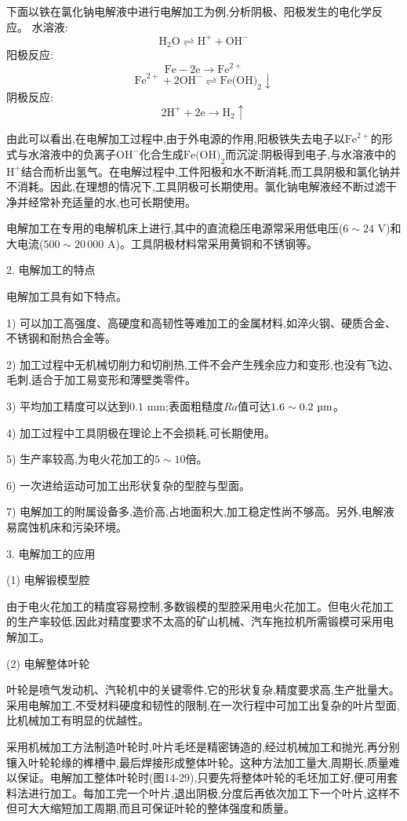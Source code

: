 \documentclass[UTF8]{ctexbook}
\newcommand{\◎}{\ensuremath{\bigcirc}}
\begin{document}
下面以铁在氯化钠电解液中进行电解加工为例,分析阴极、阳极发生的电化学反应。
水溶液:
\[ \text{H}_2\text{O} \rightleftharpoons \text{H}^+ + \text{OH}^- \]
阳极反应:
\[ \text{Fe} - 2\text{e} \longrightarrow \text{Fe}^{2+} \]
\[ \text{Fe}^{2+} + 2\text{OH}^- \rightleftharpoons \text{Fe(OH)}_2 \downarrow \]
阴极反应:
\[ 2\text{H}^+ + 2\text{e} \longrightarrow \text{H}_2 \uparrow \]

由此可以看出,在电解加工过程中,由于外电源的作用,阳极铁失去电子以$\text{Fe}^{2+}$的形式与水溶液中的负离子$\text{OH}^-$化合生成$\text{Fe(OH)}_2$而沉淀;阴极得到电子,与水溶液中的$\text{H}^+$结合而析出氢气。在电解过程中,工件阳极和水不断消耗,而工具阴极和氯化钠并不消耗。因此,在理想的情况下,工具阴极可长期使用。氯化钠电解液经不断过滤干净并经常补充适量的水,也可长期使用。

电解加工在专用的电解机床上进行,其中的直流稳压电源常采用低电压($6 \sim 24 \text{ V}$)和大电流($500 \sim 20\,000 \text{ A}$)。工具阴极材料常采用黄铜和不锈钢等。

2. 电解加工的特点

电解加工具有如下特点。

1) 可以加工高强度、高硬度和高韧性等难加工的金属材料,如淬火钢、硬质合金、不锈钢和耐热合金等。

2) 加工过程中无机械切削力和切削热,工件不会产生残余应力和变形,也没有飞边、毛刺,适合于加工易变形和薄壁类零件。

3) 平均加工精度可以达到$0.1 \text{ mm}$;表面粗糙度$Ra$值可达$1.6 \sim 0.2 \text{ \textmu m}$。

4) 加工过程中工具阴极在理论上不会损耗,可长期使用。

5) 生产率较高,为电火花加工的$5 \sim 10$倍。

6) 一次进给运动可加工出形状复杂的型腔与型面。

7) 电解加工的附属设备多,造价高,占地面积大,加工稳定性尚不够高。另外,电解液易腐蚀机床和污染环境。

3. 电解加工的应用

(1) 电解锻模型腔

由于电火花加工的精度容易控制,多数锻模的型腔采用电火花加工。但电火花加工的生产率较低,因此对精度要求不太高的矿山机械、汽车拖拉机所需锻模可采用电解加工。

(2) 电解整体叶轮

叶轮是喷气发动机、汽轮机中的关键零件,它的形状复杂,精度要求高,生产批量大。采用电解加工,不受材料硬度和韧性的限制,在一次行程中可加工出复杂的叶片型面,比机械加工有明显的优越性。

采用机械加工方法制造叶轮时,叶片毛坯是精密铸造的,经过机械加工和抛光,再分别镶入叶轮轮缘的榫槽中,最后焊接形成整体叶轮。这种方法加工量大,周期长,质量难以保证。电解加工整体叶轮时(图14-29),只要先将整体叶轮的毛坯加工好,便可用套料法进行加工。每加工完一个叶片,退出阴极,分度后再依次加工下一个叶片,这样不但可大大缩短加工周期,而且可保证叶轮的整体强度和质量。
\end{document}
